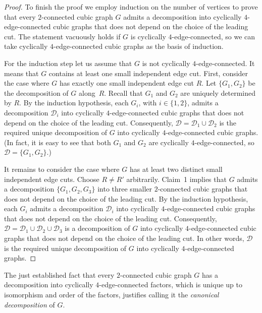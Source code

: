 \documentclass[a4paper]{amsart}
\theoremstyle{plain}
\theoremstyle{definition}
\begin{document}
\begin{proof}
\medskip

To finish the proof we employ induction on the number of
vertices to prove that every $2$-connected cubic graph $G$
admits a decomposition into cyclically $4$-edge-connected cubic
graphs that does not depend on the choice of the leading cut.
The statement vacuously holds if $G$ is cyclically
$4$-edge-connected, so we can take cyclically
$4$-edge-connected cubic graphs as the basis of induction.

For the induction step let us assume that $G$ is not cyclically
$4$-edge-connected. It means that $G$ contains at least one
small independent edge cut. First, consider the case where $G$
has exactly one small independent edge cut $R$. Let
$\{G_1,G_2\}$ be the decomposition of $G$ along~$R$. Recall
that $G_1$ and $G_2$ are uniquely determined by $R$. 
By the induction hypothesis, each $G_i$, with $i\in\{1,2\}$,
admits a decomposition
$\mathcal{D}_i$ into cyclically $4$-edge-connected cubic graphs
that does not depend on the choice of the leading cut.
Consequently, $\mathcal{D}=\mathcal{D}_1\cup\mathcal{D}_2$ is
the required unique decomposition of $G$ into cyclically 
$4$-edge-connected cubic graphs.
(In fact, it is easy to see that both $G_1$ and $G_2$ are cyclically $4$-edge-connected, so $\mathcal{D}=\{G_1,G_2\}$.)

It remains to consider the case where $G$ has at least two
distinct small independent edge cuts. Choose $R\ne R'$
arbitrarily. Claim~1 implies that $G$ admits a decomposition
$\{G_1,G_2,G_3\}$ into three smaller $2$-connected cubic graphs
that does not depend on the choice of the leading cut. By the
induction hypothesis, each $G_i$ admits a decomposition
$\mathcal{D}_i$ into cyclically $4$-edge-connected cubic graphs
that does not depend on the choice of the leading cut.
Consequently,
$\mathcal{D}=\mathcal{D}_1\cup\mathcal{D}_2\cup\mathcal{D}_3$
is a decomposition of $G$ into cyclically $4$-edge-connected
cubic graphs that does not depend on the choice of the leading
cut. In other words, $\mathcal{D}$ is the required unique
decomposition of $G$ into cyclically $4$-edge-connected graphs.
\end{proof}

The just established fact that every $2$-connected cubic graph
$G$ has a decomposition into cyclically $4$-edge-connected
factors, which is unique up to isomorphism and order of the
factors, justifies calling it the \emph{canonical
decomposition} of $G$.
\end{document}
